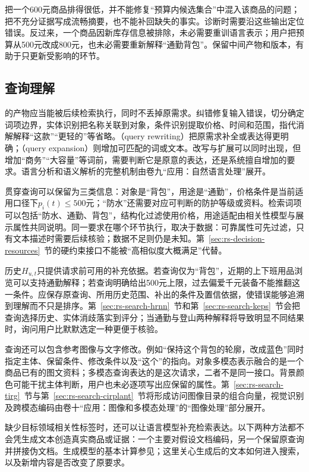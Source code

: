 把一个600元商品排得很低，并不能修复“预算内候选集合”中混入该商品的问题；把不充分证据写成流畅摘要，也不能补回缺失的事实。诊断时需要沿这些输出定位错误。反过来，一个商品因新库存信息被排除，未必需要重训语言表示；用户把预算从500元改成800元，也未必需要重新解释“通勤背包”。保留中间产物和版本，有助于只更新受影响的环节。

\subsection{查询理解}
\label{sec:rs-search-query}

的产物应当能被后续检索执行，同时不丢掉原需求。纠错修复输入错误，切分确定词项边界，实体识别把名称关联到对象，条件识别提取价格、时间和范围，指代消解解释“这款”“更轻的”等省略。（query rewriting）把原需求补全或表达得更明确；（query expansion）则增加可匹配的词或文本。改写与扩展可以同时出现，但增加“商务”“大容量”等词前，需要判断它是原意的表达，还是系统擅自增加的要求。语言分析和语义解析的完整机制由卷九“应用：自然语言处理”展开。

贯穿查询可以保留为三类信息：对象是“背包”，用途是“通勤”，价格条件是当前适用口径下$p_i(t)\leq500$元；“防水”还需要对应可判断的防护等级或资料。检索词项可以包括“防水、通勤、背包”，结构化过滤使用价格，用途适配由相关性模型与展示属性共同说明。同一要求在哪个环节执行，取决于数据：可靠属性可先过滤，只有文本描述时需要后续核验；数据不足则仍是未知。第~\ref{sec:rs-decision-resources}~节的硬约束接口不能被“高相似度大概满足”代替。

历史$H_{u,t}$只提供请求前可用的补充依据。若查询仅为“背包”，近期的上下班用品浏览可以支持通勤解释；若查询明确给出500元上限，过去偏爱千元装备不能推翻这一条件。应保存原查询、所用历史范围、补出的条件及置信依据，使错误能够追溯到理解而不只是排序。第~\ref{sec:rs-search-hrnn}~节和第~\ref{sec:rs-search-keps}~节会把查询选择历史、实体消歧落实到评分；当通勤与登山两种解释将导致明显不同结果时，询问用户比默默选定一种更便于核验。

查询还可以包含参考图像与文字修改。例如“保持这个背包的轮廓，改成蓝色”同时指定主体、保留条件、修改条件以及“这个”的指向。对象多模态表示融合的是一个商品已有的图文资料；多模态查询表达的是这次请求，二者不是同一接口。背景颜色可能干扰主体判断，用户也未必逐项写出应保留的属性。第~\ref{sec:rs-search-tirg}~节与第~\ref{sec:rs-search-cirplant}~节将形成访问图像目录的组合向量，视觉识别及跨模态编码由卷十“应用：图像和多模态处理”的“图像处理”部分展开。

缺少目标领域相关性标签时，还可以让语言模型补充检索表达。以下两种方法都不会凭生成文本创造真实商品或证据：一个主要对假设文档编码，另一个保留原查询并拼接伪文档。生成模型的基本计算参见；这里关心生成后的文本如何进入搜索，以及新增内容是否改变了原要求。

